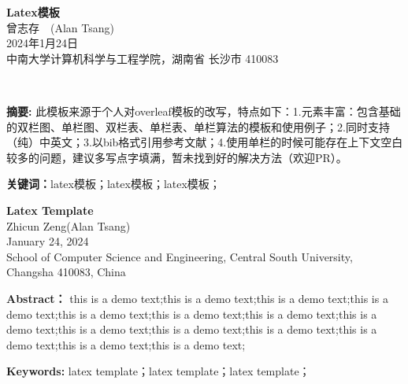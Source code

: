 \documentclass{template.cls} %
\newcommand{\name}{曾志存}
\newcommand{\stuid}{Alan Tsang}
\newcommand{\Name}{Zhicun Zeng} %
\newcommand{\newtitle}{Latex模板}
\begin{document}
\begin{center}
 \textbf{\newtitle}\\
 \kaishu \name \ \ (\stuid)\\
 \kaishu 2024年1月24日\\中南大学计算机科学与工程学院，湖南省 长沙市 410083\\
\end{center} 

\textbf{摘\quad 要:}
此模板来源于个人对overleaf模板的改写，特点如下：1.元素丰富：包含基础的双栏图、单栏图、双栏表、单栏表、单栏算法的模板和使用例子；2.同时支持（纯）中英文；3.以bib格式引用参考文献；4.使用单栏的时候可能存在上下文空白较多的问题，建议多写点字填满，暂未找到好的解决方法（欢迎PR）。

\textbf{关键词：}latex模板；latex模板；latex模板；
~\\

\begin{center}
	 \textbf{Latex Template}\\
	 \Name\quad (\stuid)\\
	 January 24, 2024 \\ School of Computer Science and Engineering, Central South University, Changsha 410083, China
\end{center}

\textbf{Abstract：}
this is a demo text;this is a demo text;this is a demo text;this is a demo text;this is a demo text;this is a demo text;this is a demo text;this is a demo text;this is a demo text;this is a demo text;this is a demo text;this is a demo text;this is a demo text;this is a demo text;

\textbf{Keywords: }latex template；latex template；latex template；
\end{document}
